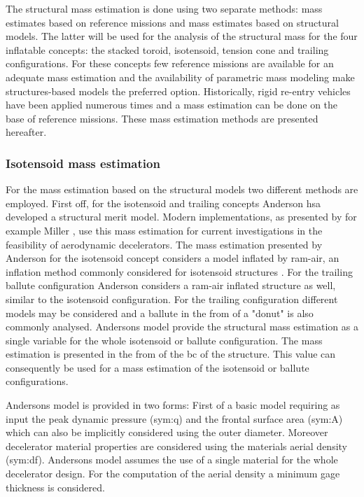 The structural mass estimation is done using two separate methods: mass estimates based on reference missions and mass estimates based on structural models. The latter will be used for the analysis of the structural mass for the four inflatable concepts: the stacked toroid, isotensoid, tension cone and trailing configurations. For these concepts few reference missions are available for an adequate mass estimation and the availability of parametric mass modeling \cite{Anderson1969, Samareh2011} make structures-based models the preferred option. Historically, rigid re-entry vehicles have been applied numerous times and a mass estimation can be done on the base of reference missions. These mass estimation methods are presented hereafter.

\subsubsection{Isotensoid mass estimation}
For the mass estimation based on the structural models two different methods are employed. First off, for the isotensoid and trailing concepts Anderson \cite{Anderson1969} hsa developed a structural merit model. Modern implementations, as presented by for example Miller \cite{Miller2014}, use this mass estimation for current investigations in the feasibility of aerodynamic decelerators. The mass estimation presented by Anderson for the isotensoid concept considers a model inflated by ram-air, an inflation method commonly considered for isotensoid structures \cite{Smith2011}. For the trailing ballute configuration Anderson considers a ram-air inflated structure as well, similar to the isotensoid configuration. For the trailing configuration different models may be considered and a ballute in the from of a "donut" is also commonly analysed. 
Andersons model provide the structural mass estimation as a single variable for the whole isotensoid or ballute configuration. The mass estimation is presented in the from of the \gls{bc} of the structure. This value can consequently be used for a mass estimation of the isotensoid or ballute configurations.

Andersons model is provided in two forms: First of a basic model requiring as input the peak dynamic pressure (\gls{sym:q}) and the frontal surface area (\gls{sym:A}) which can also be implicitly considered using the outer diameter. Moreover decelerator material properties are considered using the materials aerial density (\gls{sym:df}). Andersons model assumes the use of a single material for the whole decelerator design. For the computation of the aerial density a minimum gage thickness is considered.

